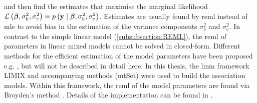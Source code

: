 %
and then find the estimates that maximise the marginal likelihood \(\mathcal{L}\left(\boldsymbol{\mathbf{\beta}}, \sigma_b^2, \sigma_e^2\right) = p\left(\boldsymbol{\mathbf{y}}\mid \boldsymbol{\mathbf{\beta}},\sigma_b^2, \sigma_e^2\right)\). 
Estimates are usually found by \gls{reml} instead of \gls{mle} to avoid bias in the estimation of the variance components \(\sigma_b^2\) and \( \sigma_e^2\). In contrast to the simple linear model (\cref{subsubsection:REML}), the \gls{reml} of parameters in linear mixed models cannot be solved in closed-form. Different methods for the efficient estimation of the model parameters have been proposed e.g. \citep{Lippert2011}, but will not be described in detail here. In this thesis, the \gls{lmm} framework LIMIX and accompanying methods (mtSet) were used to build the association models. Within this framework, the \gls{reml} of the model parameters are found via Broyden's method \citep{Broyden1965}. Details of the implementation can be found in \citep[Supplementary material]{Casale2015}.

